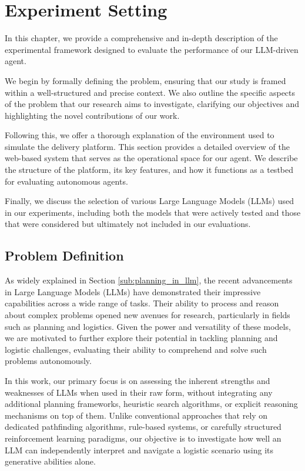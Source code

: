 \chapter{Experiment Setting}
\label{cha:experiment_setting}

In this chapter, we provide a comprehensive and in-depth description of the experimental
framework designed to evaluate the performance of our LLM-driven agent.

We begin by formally defining the problem, ensuring that our study is framed
within a well-structured and precise context. We also outline the specific aspects
of the problem that our research aims to investigate, clarifying our objectives
and highlighting the novel contributions of our work.

Following this, we offer a thorough explanation of the environment used to simulate
the delivery platform. This section provides a detailed overview of the web-based
system that serves as the operational space for our agent. We describe the structure
of the platform, its key features, and how it functions as a testbed for evaluating
autonomous agents.

Finally, we discuss the selection of various Large Language Models (LLMs) used
in our experiments, including both the models that were actively tested and those
that were considered but ultimately not included in our evaluations.

\section{Problem Definition}
\label{sec:problem_definition}

As widely explained in Section \ref{sub:planning_in_llm}, the recent advancements
in Large Language Models (LLMs) have demonstrated their impressive capabilities across
a wide range of tasks. Their ability to process and reason about complex
problems opened new avenues for research, particularly in fields such as planning
and logistics. Given the power and versatility of these models, we are motivated
to further explore their potential in tackling planning and logistic challenges,
evaluating their ability to comprehend and solve such problems autonomously.

In this work, our primary focus is on assessing the inherent strengths and weaknesses
of LLMs when used in their raw form, without integrating any additional planning
frameworks, heuristic search algorithms, or explicit reasoning mechanisms on top
of them. Unlike conventional approaches that rely on dedicated pathfinding algorithms,
rule-based systems, or carefully structured reinforcement learning paradigms,
our objective is to investigate how well an LLM can independently interpret and
navigate a logistic scenario using its generative abilities alone.

